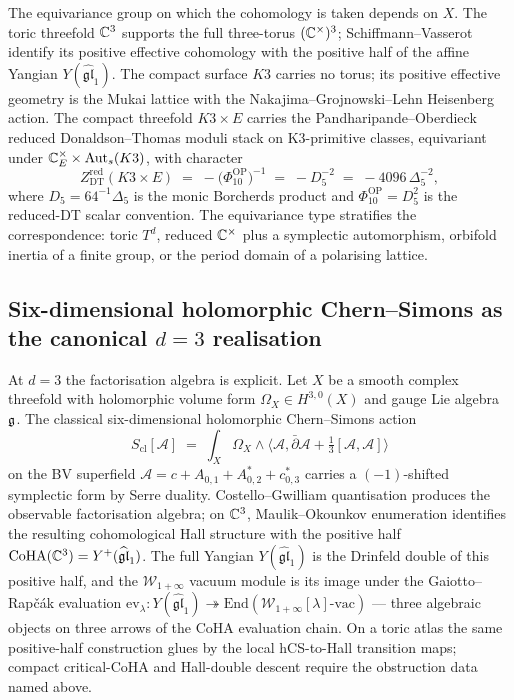The equivariance group on which the cohomology is taken depends on
$X$. The toric threefold $\mathbb{C}^3$ supports the full three-torus
$(\mathbb{C}^\times)^3$; Schiffmann--Vasserot identify its positive
effective cohomology with the positive half of the affine Yangian
\(Y(\widehat{\mathfrak{gl}}_1)\). The compact surface \(K3\) carries no
torus; its positive effective geometry is the Mukai lattice with the
Nakajima--Grojnowski--Lehn Heisenberg action. The compact threefold
\(K3\times E\) carries the Pandharipande--Oberdieck reduced
Donaldson--Thomas moduli stack on K3-primitive classes, equivariant
under \(\mathbb{C}^\times_E\times\mathrm{Aut}_s(K3)\), with character
\[
Z^{\mathrm{red}}_{\mathrm{DT}}(K3 \times E)
\;=\; -\bigl(\Phi_{10}^{\mathrm{OP}}\bigr)^{-1}
\;=\; -D_5^{-2}
\;=\; -4096\,\Delta_5^{-2},
\]
where \(D_5=64^{-1}\Delta_5\) is the monic Borcherds product and
\(\Phi_{10}^{\mathrm{OP}}=D_5^2\) is the reduced-DT scalar convention.
The equivariance type stratifies the correspondence: toric $T^d$, reduced
\(\mathbb{C}^\times\) plus a symplectic automorphism, orbifold inertia of a
finite group, or the period domain of a polarising lattice.

\subsection*{Six-dimensional holomorphic Chern--Simons as the
canonical \texorpdfstring{$d{=}3$}{d=3} realisation}
\label{wn:sec:platonic-preface-6d-hCS}

At \(d=3\) the factorisation algebra is explicit. Let \(X\) be a smooth
complex threefold with holomorphic volume form
\(\Omega_X\in H^{3,0}(X)\) and gauge Lie algebra \(\mathfrak{g}\). The classical
six-dimensional holomorphic Chern--Simons action
\[
S_{\mathrm{cl}}[\mathcal A] \;=\; \int_X \Omega_X \wedge
\bigl\langle \mathcal A, \bar\partial \mathcal A
+ \tfrac{1}{3}[\mathcal A, \mathcal A] \bigr\rangle
\]
on the BV superfield
\(\mathcal A=c+A_{0,1}+A^*_{0,2}+c^*_{0,3}\) carries a
\((-1)\)-shifted symplectic form by Serre duality. Costello--Gwilliam
quantisation produces the observable factorisation algebra; on
\(\mathbb{C}^3\), Maulik--Okounkov enumeration identifies the resulting
cohomological Hall structure with the positive half
\(\mathrm{CoHA}(\mathbb{C}^3) = Y^+(\widehat{\mathfrak{gl}}_1)\).
The full Yangian \(Y(\widehat{\mathfrak{gl}}_1)\) is the Drinfeld
double of this positive half, and the \(\mathcal W_{1+\infty}\) vacuum
module is its image under the Gaiotto--Rap\v c\'ak evaluation
\(\mathrm{ev}_\lambda \colon Y(\widehat{\mathfrak{gl}}_1) \twoheadrightarrow
\mathrm{End}(\mathcal W_{1+\infty}[\lambda]\text{-vac})\) — three
algebraic objects on three arrows of the CoHA evaluation chain. On a toric
atlas the same positive-half construction glues by the local
hCS-to-Hall transition maps; compact critical-CoHA and Hall-double
descent require the obstruction data named above.

